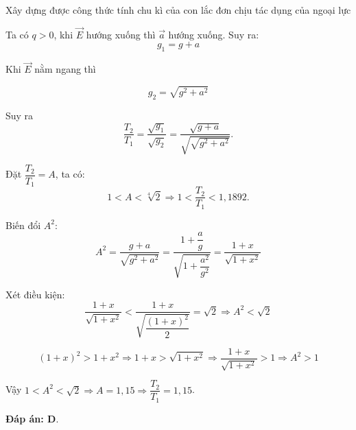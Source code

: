 \begin{dang}{Xây dựng được công thức tính chu kì của con lắc đơn chịu tác dụng của ngoại lực}
{		Ta có $q>0$, khi $\vec E$ hướng xuống thì $\vec a$ hướng xuống. Suy ra:
		$$g_1 = g+a$$
		
		Khi $\vec E$ nằm ngang thì
		
		$$g_2=\sqrt{g^2 + a^2}$$
		
		Suy ra $$\dfrac{T_2}{T_1}=\dfrac{\sqrt{g_1}}{\sqrt{g_2}}=\dfrac{\sqrt{g+a}}{\sqrt{\sqrt{g^2+a^2}}}.$$
		
		Đặt $\dfrac{T_2}{T_1} = A$, ta có:
		$$1<A<\sqrt[4]{2} \Rightarrow 1 <\dfrac{T_2}{T_1} < 1,1892.$$
		
		Biến đổi $A^2$:
		$$A^2 = \dfrac{g+a}{\sqrt{g^2+a^2}}=\dfrac{1+\dfrac{a}{g}}{\sqrt{1+\dfrac{a^2}{g^2}}}=\dfrac{1+x}{\sqrt{1+x^2}}$$
		
		Xét điều kiện:
		$$\dfrac{1+x}{\sqrt{1+x^2}}<\dfrac{1+x}{\sqrt{\dfrac{(1+x)^2}{2}}}=\sqrt{2} \Rightarrow A^2 < \sqrt{2}$$
		
		$$(1+x)^2 > 1+x^2 \Rightarrow 1+x > \sqrt{1+x^2} \Rightarrow \dfrac{1+x}{\sqrt{1+x^2}}>1 \Rightarrow A^2 > 1$$
		
		Vậy $1<A^2 < \sqrt{2} \Rightarrow A=1,15 \Rightarrow \dfrac{T_2}{T_1} = 1,15$.
		
		\textbf{Đáp án: D}.
	}
\end{dang}

